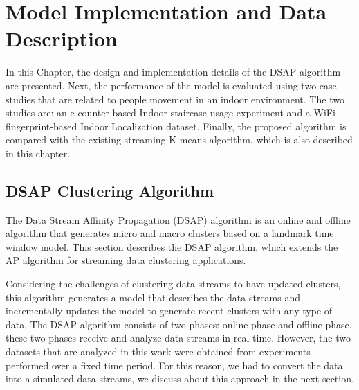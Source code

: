 \documentclass[../UNBThesis2.tex]{subfiles}
\begin{document}
\chapter{ Model Implementation and Data Description}

In this Chapter, the design and implementation details of the DSAP algorithm are presented. Next, the performance of the model is evaluated using two case studies that are related to people movement in an indoor environment. The two studies are: an e-counter based Indoor staircase usage experiment and a WiFi fingerprint-based Indoor Localization dataset. Finally, the proposed algorithm is compared with the existing streaming K-means algorithm, which is also described in this chapter.








\section{DSAP Clustering Algorithm}
The Data Stream Affinity Propagation (DSAP) algorithm is an online and offline algorithm that generates micro and macro clusters based on a landmark time window model. This section describes the DSAP algorithm, which extends the AP algorithm for streaming data clustering applications. 

Considering the challenges of clustering data streams to have updated clusters, this algorithm generates a model that describes the data streams and incrementally updates the model to generate recent clusters with any type of data. The DSAP algorithm consists of two phases: online phase and offline phase. these two phases receive and analyze data streams in real-time. However, the two datasets that are analyzed in this work were obtained from experiments performed over a fixed time period. For this reason, we had to convert the data into a simulated data streams, we discuss about this approach in the next section.
\end{document}
